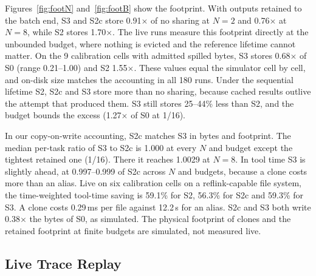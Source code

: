 Figures~\ref{fig:footN} and~\ref{fig:footB} show the footprint. With outputs retained to the batch end, S3 and S2c
store 0.91$\times$ of no sharing at $N=2$ and 0.76$\times$ at $N=8$, while S2 stores 1.70$\times$. The live runs
measure this footprint directly at the unbounded budget, where nothing is evicted and the reference lifetime cannot
matter. On the 9 calibration cells with admitted spilled bytes, S3 stores 0.68$\times$ of S0 (range 0.21--1.00) and
S2 1.55$\times$. These values equal the simulator cell by cell, and on-disk size matches the accounting in all 180 runs. Under the sequential lifetime S2, S2c and S3 store more than no sharing, because cached results
outlive the attempt that produced them. S3 still stores 25--44\% less than S2, and the budget bounds the excess
(1.27$\times$ of S0 at 1/16).

In our copy-on-write accounting, S2c matches S3 in bytes and footprint. The median per-task ratio of S3 to S2c is 1.000 at every $N$ and budget except the tightest retained one (1/16). There it reaches 1.0029 at $N=8$. In tool
time S3 is slightly ahead, at 0.997--0.999 of S2c across $N$ and budgets, because a clone costs more than an alias.
Live on six calibration cells on a reflink-capable file system, the time-weighted tool-time saving is 59.1\% for S2,
56.3\% for S2c and 59.3\% for S3. A clone costs 0.29\,ms per file against 12.2\,\textmu s for an alias. S2c and S3
both write 0.38$\times$ the bytes of S0, as simulated. The physical footprint of clones and the retained footprint
at finite budgets are simulated, not measured live. 



\subsection{Live Trace Replay}
\label{sec:e2e}

